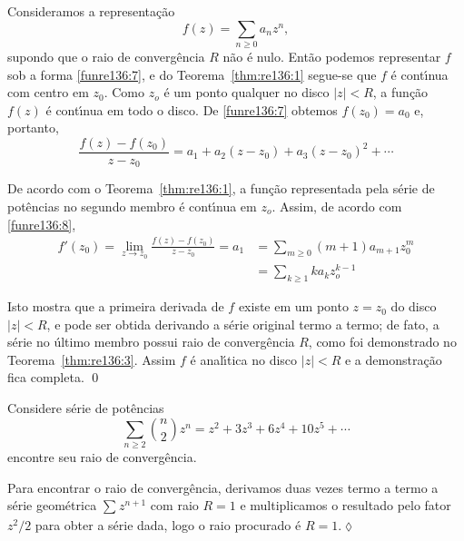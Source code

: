\begin{prova} Consideramos a representa\c{c}\~{a}o
\begin{equation*}
f(z)=\sum_{n\geq 0}a_nz^{n},
\end{equation*}
supondo que o raio de converg\^{e}ncia $R$ n\~{a}o \'{e} nulo. Ent\~{a}o podemos
representar $f$ sob a forma \eqref{funre136:7}, e do
Teorema~\ref{thm:re136:1} segue-se que $f$ \'{e} cont\'{\i}nua com centro em
$z_{0}$. Como $z_o$ \'{e} um ponto qualquer no disco $|z|< R$, a fun\c{c}\~{a}o
$f(z)$ \'{e} cont\'{\i}nua em todo o disco. De \eqref{funre136:7} obtemos
$f(z_{0})=a_{0}$ e, portanto,
\begin{equation*}
  \frac{f(z)- f(z_{0})}{z-z_{0}}=a_1 + a_2(z - z_{0}) + a_3(z - z_{0})^2 +
  \cdots
\end{equation*}

De acordo com o Teorema~\ref{thm:re136:1}, a fun\c{c}\~{a}o representada pela
s\'{e}rie de pot\^{e}ncias no segundo membro \'{e} cont\'{\i}nua em $z_o$. Assim,
de acordo com \eqref{funre136:8},
\begin{align}
  f'(z_{0})=\lim_{z\to z_{0}}\frac{f(z)-f(z_{0})}{z-z_{0}} =a_1&=\sum_{m\geq 0}(m+1)a_{m+1}z_{0}^{m}
  \nonumber\\[2ex]
   &=\sum_{k\geq 1}ka_kz_o^{k-1}\label{funre136:10}
\end{align}

Isto mostra que a primeira derivada de $f$ existe em um ponto $z = z_{0}$ do disco $|z|<R$, e pode ser obtida derivando 
a s\'{e}rie original termo a termo; de fato, a s\'{e}rie no \'{u}ltimo membro possui
raio de converg\^{e}ncia $R$, como foi demonstrado no
Teorema~\ref{thm:re136:3}.  Assim $f$ \'{e} anal\'{\i}tica no disco $|z|< R$ e
a demonstra\c{c}\~{a}o fica completa. \qed
\end{prova}

\begin{exer} Considere s\'{e}rie de pot\^{e}ncias
\begin{equation*}
\sum_{n\geq 2}\binom{n}{2}z^{n}=z^2+3z^3+6z^4+10z^5+\cdots
\end{equation*}
encontre seu raio de converg\^{e}ncia.
\end{exer}

\solo
 Para encontrar o raio de converg\^{e}ncia, derivamos duas vezes termo a termo
 a s\'{e}rie geom\'{e}trica $\sum_{}z^{n+1}$ com raio $R = 1$ e multiplicamos o resultado pelo
fator $z^2/2$ para obter a s\'{e}rie dada, logo o raio procurado \'{e}
$R=1$.\hfill \(\lozenge\)

